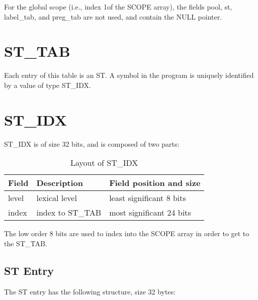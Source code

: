 For the global scope (i.e., index 1of the
%
SCOPE array), the fields
pool, st, label\_tab, and preg\_tab are not used, and contain the NULL
pointer.

\section{ST\_TAB}

Each entry of this table is an ST. A symbol in the program is uniquely
identified by a value of type ST\_IDX.

\section{ST\_IDX}

%
ST\_IDX is of size 32 bits, and is composed of two parts:

\begin{table}[h]
\centering
\caption{Layout of ST\_IDX} 
\begin{tabular}{|l|l|l|}\hline
Field & Description & Field position and size\\\hline \hline
level & lexical level & least significant 8 bits \\\hline
index & index to
\index{ST\_TAB}%
ST\_TAB & most significant 24 bits\\\hline
\end{tabular}
\end{table}


The low order 8 bits are used to index into the
%
SCOPE array in order
to get to the ST\_TAB.

\subsection{ST Entry}

The
%
ST entry has the following structure, size 32 bytes:


